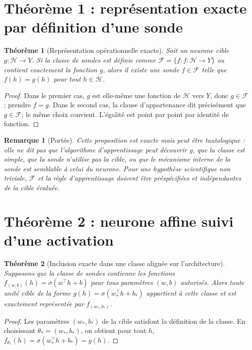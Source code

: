 \documentclass[11pt,a4paper,oneside]{report}
\newtheorem{theorem}{Théorème}[chapter]
\newtheorem{remark}{Remarque}[chapter]
\newcommand{\Hcal}{\mathcal H}
\begin{document}
\section{Théorème 1 : représentation exacte par définition d'une sonde}
\begin{theorem}[Représentation opérationnelle exacte]
Soit un neurone cible \(g:\Hcal\to Y\). Si la classe de sondes est définie comme \(\mathcal F=\{f:f:\Hcal\to Y\}\) ou contient exactement la fonction \(g\), alors il existe une sonde \(f\in\mathcal F\) telle que \(f(h)=g(h)\) pour tout \(h\in\Hcal\).
\end{theorem}
\begin{proof}
Dans le premier cas, \(g\) est elle-même une fonction de \(\Hcal\) vers \(Y\), donc \(g\in\mathcal F\); prendre \(f=g\). Dans le second cas, la clause d'appartenance dit précisément que \(g\in\mathcal F\); le même choix convient. L'égalité est point par point par identité de fonction.\end{proof}
\begin{remark}[Portée]
Cette proposition est exacte mais peut être tautologique : elle ne dit pas que l'algorithme d'apprentissage peut découvrir \(g\), que la classe est simple, que la sonde n'utilise pas la cible, ou que le mécanisme interne de la sonde est semblable à celui du neurone. Pour une hypothèse scientifique non triviale, \(\mathcal F\) et la règle d'apprentissage doivent être préspécifiées et indépendantes de la cible évaluée.
\end{remark}

\section{Théorème 2 : neurone affine suivi d'une activation}
\begin{theorem}[Inclusion exacte dans une classe alignée sur l'architecture]
Supposons que la classe de sondes contienne les fonctions \(f_{(w,b)}(h)=\sigma(w^\top h+b)\) pour tous paramètres \((w,b)\) autorisés. Alors toute unité cible de la forme \(g(h)=\sigma(w_*^\top h+b_*)\) appartient à cette classe et est exactement représentée par \(f_{(w_*,b_*)}\).
\end{theorem}
\begin{proof}
Les paramètres \((w_*,b_*)\) de la cible satisfont la définition de la classe. En choisissant \(\theta_*=(w_*,b_*)\), on obtient pour tout \(h\), \(f_{\theta_*}(h)=\sigma(w_*^\top h+b_*)=g(h)\).\end{proof}
\end{document}
